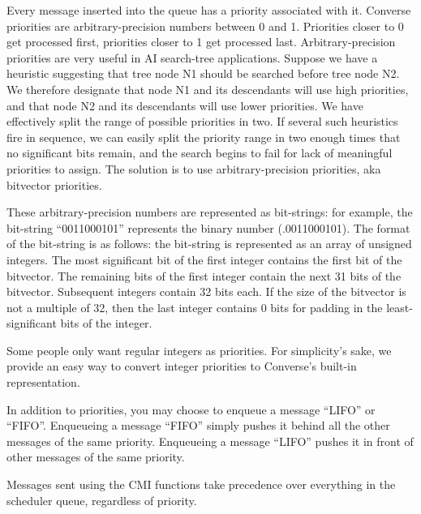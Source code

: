 Every message inserted into the queue has a priority associated with
it.  Converse priorities are arbitrary-precision numbers between 0 and
1.  Priorities closer to 0 get processed first, priorities closer to 1
get processed last.  Arbitrary-precision priorities are very useful in
AI search-tree applications. Suppose we have a heuristic suggesting
that tree node N1 should be searched before tree node N2. We therefore
designate that node N1 and its descendants will use high priorities,
and that node N2 and its descendants will use lower priorities. We
have effectively split the range of possible priorities in two. If
several such heuristics fire in sequence, we can easily split the
priority range in two enough times that no significant bits remain,
and the search begins to fail for lack of meaningful priorities to
assign. The solution is to use arbitrary-precision priorities, aka
bitvector priorities.

These arbitrary-precision numbers are represented as bit-strings: for
example, the bit-string ``0011000101'' represents the binary number
(.0011000101).  The format of the bit-string is as follows: the
bit-string is represented as an array of unsigned integers. The most
significant bit of the first integer contains the first bit of the
bitvector.  The remaining bits of the first integer contain the next
31 bits of the bitvector.  Subsequent integers contain 32 bits
each. If the size of the bitvector is not a multiple of 32, then the
last integer contains 0 bits for padding in the least-significant bits
of the integer.

Some people only want regular integers as priorities.  For
simplicity's sake, we provide an easy way to convert integer
priorities to Converse's built-in representation.

In addition to priorities, you may choose to enqueue a message
``LIFO'' or ``FIFO''.  Enqueueing a message ``FIFO'' simply pushes it
behind all the other messages of the same priority.  Enqueueing a
message ``LIFO'' pushes it in front of other messages of the same
priority.

Messages sent using the CMI functions take precedence over everything
in the scheduler queue, regardless of priority.

